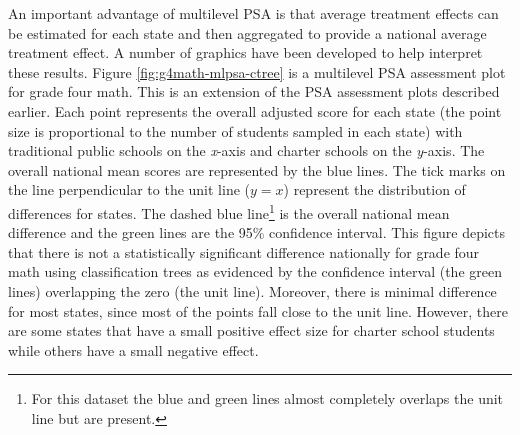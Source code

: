 \documentclass[letterpaper,12p,twoside]{article} %
\begin{document}
An important advantage of multilevel PSA is that average treatment effects can be estimated for each state and then aggregated to provide a national average treatment effect. A number of graphics have been developed to help interpret these results. Figure \ref{fig:g4math-mlpsa-ctree} is a multilevel PSA assessment plot for grade four math. This is an extension of the PSA assessment plots \cite{HelmreichPruzek2009} described earlier. Each point represents the overall adjusted score for each state (the point size is proportional to the number of students sampled in each state) with traditional public schools on the \textit{x}-axis and charter schools on the \textit{y}-axis. The overall national mean scores are represented by the blue lines. The tick marks on the line perpendicular to the unit line ($y = x$) represent the distribution of differences for states. The dashed blue line\footnote{For this dataset the blue and green lines almost completely overlaps the unit line but are present.} is the overall national mean difference and the green lines are the 95\% confidence interval. This figure depicts that there is not a statistically significant difference nationally for grade four math using classification trees as evidenced by the confidence interval (the green lines) overlapping the zero (the unit line). Moreover, there is minimal difference for most states, since most of the points fall close to the unit line. However, there are some states that have a small positive effect size for charter school students  while others have a small negative effect. 
\end{document}
